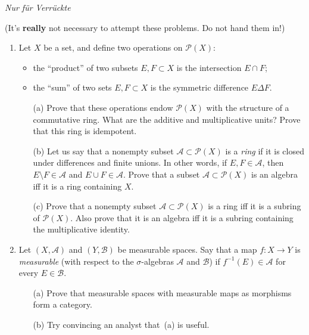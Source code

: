 \documentclass[11pt]{article}
\newcommand{\cA}{\mathcal{A}}
\newcommand{\cB}{\mathcal{B}}
\newcommand{\cP}{\mathcal{P}}
\begin{document}
\newpage
\begin{center}
  \textit{Nur f\"ur Verr\"uckte}
\end{center}
(It's \textbf{really} not necessary to attempt these problems. Do not hand them in!)
\begin{enumerate}
\item
  Let $X$ be a set, and define two operations on $\cP(X)$:
  \begin{itemize}
  \item
    the ``product'' of two subsets $E,F\subset X$ is the intersection $E\cap F$;
  \item
    the ``sum'' of two sets $E,F\subset X$ is the symmetric difference $E\Delta F$.
  \end{itemize}
  \begin{itemize}
  \item[(a)]
    Prove that these operations endow $\cP(X)$ with the structure of a commutative ring. What are the additive and multiplicative units? Prove that this ring is idempotent.
  \item[(b)]
    Let us say that a nonempty subset $\cA\subset\cP(X)$ is a \emph{ring} if it is closed under differences and finite unions. In other words, if $E,F\in\cA$, then $E\setminus F\in\cA$ and $E\cup F\in\cA$. Prove that a subset $\cA\subset\cP(X)$ is an algebra iff it is a ring containing $X$.
  \item[(c)]
    Prove that a nonempty subset $\cA\subset\cP(X)$ is a ring iff it is a subring of $\cP(X)$. Also prove that it is an algebra iff it is a subring containing the multiplicative identity.
 \end{itemize}
\item
  Let $(X,\cA)$ and $(Y,\cB)$ be measurable spaces. Say that a map $f:X\to Y$ is \emph{measurable} (with respect to the $\sigma$-algebras $\cA$ and $\cB$) if $f^{-1}(E)\in\cA$ for every $E\in\cB$.
  \begin{itemize}
  \item[(a)]
    Prove that measurable spaces with measurable maps as morphisms form a category.
  \item[(b)]
    Try convincing an analyst that~(a) is useful.
  \end{itemize}
\end{enumerate}
\end{document}
